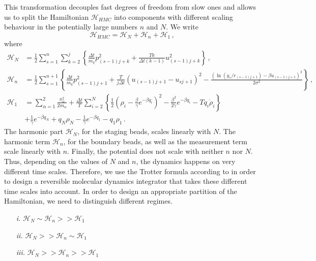 \documentclass[11pt, a4paper]{article}
\begin{document}
This transformation decouples fast degrees of freedom from slow ones and allows us to split the Hamiltonian $\mathcal H_{HMC}$ into components with different scaling behaviour in the potentially large numbers $n$ and $N$.
We write
\begin{equation}
  \mathcal H_{HMC}= \mathcal H_N+\mathcal H_n+\mathcal H_1\,,
\end{equation}
where
\begin{align}
  \mathcal H_N
  &=
  \frac{1}{2}
  \sum_{s=1}^{n}
  \sum_{k=2}^j
  \left\{
    \frac{\Delta t}{m_q}p_{(s-1)j+k}^2
    +
    \frac{Tk}{\Delta t(k-1)}
    u_{(s-1)j+k}^2
  \right\}\,,\label{H_N}
  \\
  \mathcal H_n
  &=
  \frac{1}{2}
  \sum_{s=1}^{n+1}
  \left\{
   \frac{\Delta t }{m_q}p_{(s-1)j+1}^2
    +
    \frac{T}{j\Delta t}
    (u_{(s-1)j+1} - u_{sj+1})^2
    -
    \frac{(\ln(y_s/r_{(s-1)j+1}) - {\beta u_{(s-1)j+1}})^2}{2\sigma^2}
   \right\}\,,\\
  \mathcal H_1
  &=
   \sum_{\alpha=1}^2\frac{\pi_\alpha^2}{2m_\alpha}
   +
  \frac{\Delta t}{T}
   \sum_{i=2}^{N}
   \left\{
    \frac{1}{2}
     \left(
        \rho_i-\frac{\beta}{\gamma}e^{-\beta q_i}
     \right)^2
    -
    \frac{\beta^2}{2\gamma}
    e^{-\beta q_i}
   -
    T q_i\dot\rho_i
   \right\}
  \\
  &+
  \frac{1}{\gamma}
  e^{-\beta q_N}
  +
  q_N \rho_{N}
  -
  \frac{1}{\gamma}
  e^{-\beta q_1}
  -
  q_1 \rho_{1}
\,.
\end{align}
The harmonic part $\mathcal H_N$, for the staging beads, scales linearly with $N$.
The harmonic term $\mathcal H_n$, for the boundary beads, as well as the measurement term scale linearly with $n$.
Finally, the potential does not scale with neither $n$ nor $N$.
Thus, depending on the values of $N$ and $n$, the dynamics happens on very different time scales.
Therefore, we use the Trotter formula according to \cite{tuckerman1992reversible} in order to design a reversible molecular dynamics integrator that takes these different time scales into account.
In order to design an appropriate partition of the Hamiltonian, we need to distinguish different regimes.
\begin{enumerate}
  \item[\it i.]
  $\mathcal H_N \sim \mathcal H_n >> \mathcal H_1$
  \item[\it ii.]
  $\mathcal H_N >> \mathcal H_n \sim \mathcal H_1$
  \item[\it iii.]
  $\mathcal H_N >> \mathcal H_n >> \mathcal H_1$
\end{enumerate}
\end{document}
